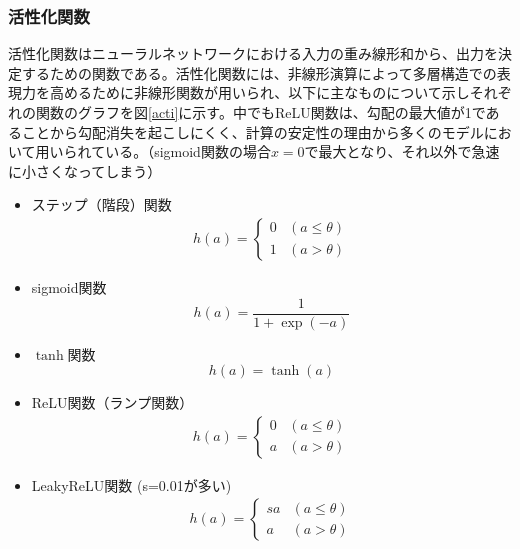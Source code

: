\subsubsection{活性化関数}
活性化関数はニューラルネットワークにおける入力の重み線形和から、出力を決定するための関数である。活性化関数には、非線形演算によって多層構造での表現力を高めるために非線形関数が用いられ、以下に主なものについて示しそれぞれの関数のグラフを図\ref{acti}に示す。中でもReLU関数は、勾配の最大値が1であることから勾配消失を起こしにくく、計算の安定性の理由から多くのモデルにおいて用いられている。（sigmoid関数の場合$x=0$で最大となり、それ以外で急速に小さくなってしまう）
\begin{itemize}
	\item ステップ（階段）関数
		\begin{align}
			h(a) =
			\begin{cases}
			0 & (a \leq \theta)\\
			1 & (a > \theta)
			\end{cases}
		\end{align}
	\item sigmoid関数
		\begin{equation}
			h(a) = \frac{1}{1+\exp(-a)}
		\end{equation}
	\item $\tanh$関数
		\begin{equation}
			h(a) = \tanh(a)
	\end{equation}
	\item ReLU関数（ランプ関数）
		\begin{align}
			h(a) =
			\begin{cases}
			0 & (a \leq \theta)\\
			a & (a > \theta)
			\end{cases}
		\end{align}
	\item LeakyReLU関数 (s=0.01が多い)
		\begin{align}
			h(a) =
			\begin{cases}
			sa & (a \leq \theta)\\
			a & (a > \theta)
			\end{cases}
		\end{align}
\end{itemize}
